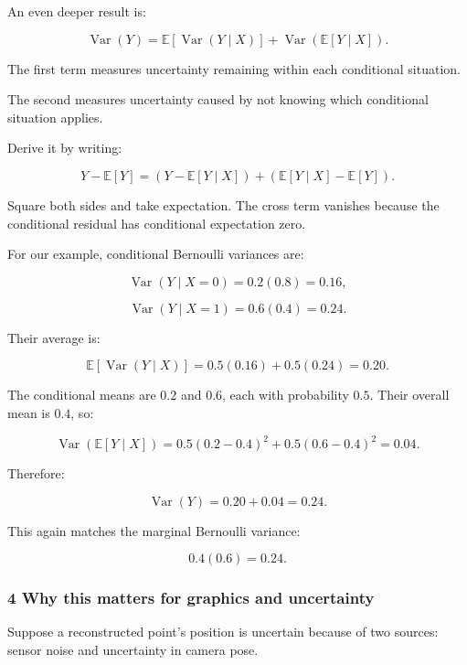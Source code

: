 \hypertarget{02-foundations-ii-ch023-law-of-total-variance}{}

An even deeper result is:

\[
 \boxed{ \operatorname{Var}(Y) = \mathbb E[\operatorname{Var}(Y\mid X)] + \operatorname{Var}(\mathbb E[Y\mid X]) }.
\]

The first term measures uncertainty remaining within each conditional situation.

The second measures uncertainty caused by not knowing which conditional situation applies.

Derive it by writing:

\[
 Y-\mathbb E[Y] = (Y-\mathbb E[Y\mid X]) + (\mathbb E[Y\mid X]-\mathbb E[Y]).
\]

Square both sides and take expectation. The cross term vanishes because the conditional residual has conditional expectation zero.

For our example, conditional Bernoulli variances are:

\[
 \operatorname{Var}(Y\mid X=0)=0.2(0.8)=0.16,
\]

\[
 \operatorname{Var}(Y\mid X=1)=0.6(0.4)=0.24.
\]

Their average is:

\[
 \mathbb E[\operatorname{Var}(Y\mid X)] = 0.5(0.16)+0.5(0.24) =\boxed{0.20}.
\]

The conditional means are \(0.2\) and \(0.6\), each with probability \(0.5\). Their overall mean is \(0.4\), so:

\[
 \operatorname{Var}(\mathbb E[Y\mid X]) = 0.5(0.2-0.4)^2+ 0.5(0.6-0.4)^2 =\boxed{0.04}.
\]

Therefore:

\[
 \operatorname{Var}(Y)=0.20+0.04=\boxed{0.24}.
\]

This again matches the marginal Bernoulli variance:

\[
 0.4(0.6)=0.24.
\]

\subsubsection{4 Why this matters for graphics and uncertainty}\label{02-foundations-ii-ch023-why-this-matters-for-graphics-and-uncertainty}

\hypertarget{02-foundations-ii-ch023-why-this-matters-for-graphics-and-uncertainty}{}

Suppose a reconstructed point's position is uncertain because of two sources: sensor noise and uncertainty in camera pose.

